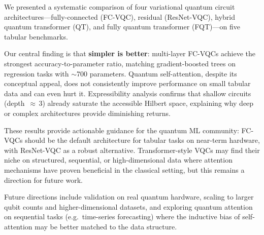 We presented a systematic comparison of four variational quantum circuit
architectures---fully-connected (FC-VQC), residual (ResNet-VQC), hybrid
quantum transformer (QT), and fully quantum transformer (FQT)---on five
tabular benchmarks.

Our central finding is that \textbf{simpler is better}: multi-layer FC-VQCs
achieve the strongest accuracy-to-parameter ratio, matching gradient-boosted
trees on regression tasks with ${\sim}$700 parameters.  Quantum
self-attention, despite its conceptual appeal, does not consistently improve
performance on small tabular data and can even hurt it.  Expressibility
analysis confirms that shallow circuits (depth~${\approx}\,3$) already
saturate the accessible Hilbert space, explaining why deep or complex
architectures provide diminishing returns.


These results provide actionable guidance for the quantum ML community:
FC-VQCs should be the default architecture for tabular tasks on near-term
hardware, with ResNet-VQC as a robust alternative.  Transformer-style VQCs
may find their niche on structured, sequential, or high-dimensional data
where attention mechanisms have proven beneficial in the classical setting,
but this remains a direction for future work.

Future directions include validation on real quantum hardware, scaling to
larger qubit counts and higher-dimensional datasets, and exploring quantum
attention on sequential tasks (e.g.\ time-series forecasting) where the
inductive bias of self-attention may be better matched to the data structure.
